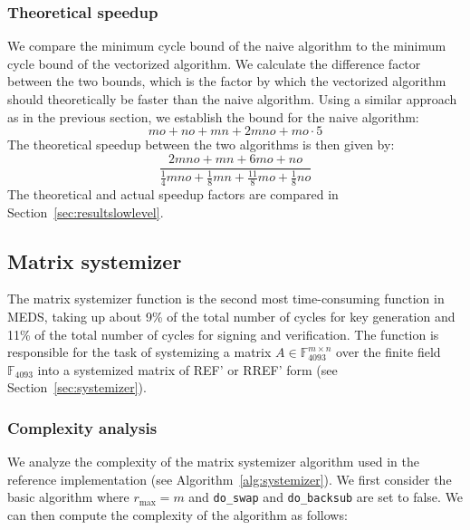 \documentclass[11pt,a4paper]{report}
\theoremstyle{definition}
\begin{document}
\subsubsection{Theoretical speedup}
We compare the minimum cycle bound of the naive algorithm to the minimum cycle bound of the vectorized algorithm. We calculate the difference factor between the two bounds, which is the factor by which the vectorized algorithm should theoretically be faster than the naive algorithm. Using a similar approach as in the previous section, we establish the bound for the naive algorithm:
\[
  mo + no + mn + 2 mno + mo \cdot 5
\]
The theoretical speedup between the two algorithms is then given by:
\[
  \frac{2 mno + mn + 6 mo + no}{\frac{1}{4}mno + \frac{1}{8}mn + \frac{11}{8}mo + \frac{1}{8}no}
\]
The theoretical and actual speedup factors are compared in Section~\ref{sec:resultslowlevel}.

\subsection{Matrix systemizer}
\label{sec:matrixsystemizer}
The matrix systemizer function is the second most time-consuming function in MEDS, taking up about 9\% of the total number of cycles for key generation and 11\% of the total number of cycles for signing and verification. The function is responsible for the task of systemizing a matrix $A \in \mathbb{F}_{4093}^{m \times n}$ over the finite field $\mathbb{F}_{4093}$ into a systemized matrix of REF' or RREF' form (see Section~\ref{sec:systemizer}).

\subsubsection{Complexity analysis}
\label{sec:matrixsystemizercomplexity}
We analyze the complexity of the matrix systemizer algorithm used in the reference implementation (see Algorithm~\ref{alg:systemizer}). We first consider the basic algorithm where $r_\text{max} = m$ and \texttt{do\_swap} and \texttt{do\_backsub} are set to false. We can then compute the complexity of the algorithm as follows:
\end{document}
